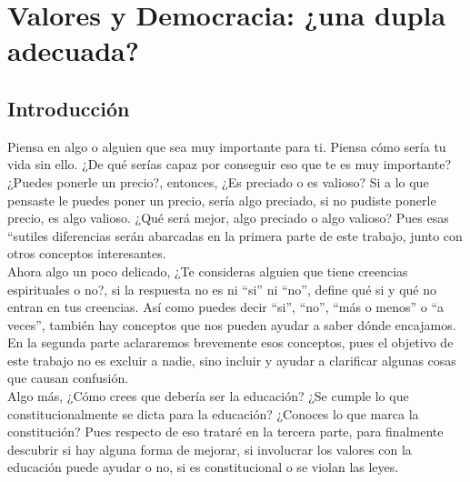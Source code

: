 \documentclass[12pt]{book} %
\begin{document}
\chapter{Valores y Democracia: ¿una dupla adecuada?}

\section{Introducción}
Piensa en algo o alguien que sea muy importante para ti. Piensa cómo sería tu vida sin ello. ¿De qué serías capaz por conseguir eso que te es muy importante? ¿Puedes ponerle un precio?, entonces, ¿Es preciado o es valioso? Si a lo que pensaste le puedes poner un precio, sería algo preciado, si no pudiste ponerle precio, es algo valioso. ¿Qué será mejor, algo preciado o algo valioso? Pues esas “sutiles diferencias serán abarcadas en la primera parte de este trabajo, junto con otros conceptos interesantes.\\

Ahora algo un poco delicado, ¿Te consideras alguien que tiene creencias espirituales o no?, si la respuesta no es ni “si” ni “no”, define qué si y qué no entran en tus creencias. Así como puedes decir “si”, “no”, “más o menos” o “a veces”, también hay conceptos que nos pueden ayudar a saber dónde encajamos. En la segunda parte aclararemos brevemente esos conceptos, pues el objetivo de este trabajo no es excluir a nadie, sino incluir y ayudar a clarificar algunas cosas que causan confusión.\\

Algo más, ¿Cómo crees que debería ser la educación? ¿Se cumple lo que constitucionalmente se dicta para la educación? ¿Conoces lo que marca la constitución? Pues respecto de eso trataré en la tercera parte, para finalmente descubrir si hay alguna forma de mejorar, si involucrar los valores con la educación puede ayudar o no, si es constitucional o se violan las leyes.
\end{document}
